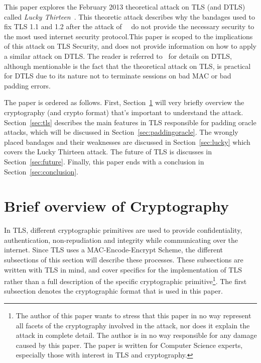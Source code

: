 \documentclass[10pt,conference,a4paper]{IEEEtran}
\begin{document}
This paper explores the February 2013 theoretical attack on TLS (and DTLS) called \textit{Lucky Thirteen}~\cite{alfardan2013lucky}. This theoretic attack describes why the bandages used to fix TLS 1.1 and 1.2 after the attack of~\citeauthor{canvel2003password}~\cite{canvel2003password} do not provide the necessary security to the most used internet security protocol.This paper is scoped to the implications of this attack on TLS Security, and does not provide information on how to apply a similar attack on DTLS. The reader is referred to~\cite{alfardan2013lucky} for details on DTLS, although mentionable is the fact that the theoretical attack on TLS, is practical for DTLS due to its nature not to terminate sessions on bad MAC or bad padding errors.

The paper is ordered as follows. First, Section~\ref{sec:crypto} will very briefly overview the cryptography (and crypto format) that's important to understand the attack. Section~\ref{sec:tls} describes the main features in TLS responsible for padding oracle attacks, which will be discussed in Section~\ref{sec:paddingoracle}. The wrongly placed bandages and their weaknesses are discussed in Section~\ref{sec:lucky} which covers the Lucky Thirteen attack. The future of TLS is discusses in Section~\ref{sec:future}. Finally, this paper ends with a conclusion in Section~\ref{sec:conclusion}.




\section{Brief overview of Cryptography}
\label{sec:crypto}
In TLS, different cryptographic primitives are used to provide confidentiality, authentication, non-repudiation and integrity while communicating over the internet. Since TLS uses a MAC-Encode-Encrypt Scheme, the different subsections of this section will describe these processes. These subsections are written with TLS in mind, and cover specifics for the implementation of TLS rather than a full description of the specific cryptographic primitive\footnote{The author of this paper wants to stress that this paper in no way represent all facets of the cryptography involved in the attack, nor does it explain the attack in complete detail. The author is in no way responsible for any damage caused by this paper. The paper is written for Computer Science experts, especially those with interest in TLS and cryptography.}. The first subsection denotes the cryptographic format that is used in this paper.
\end{document}
